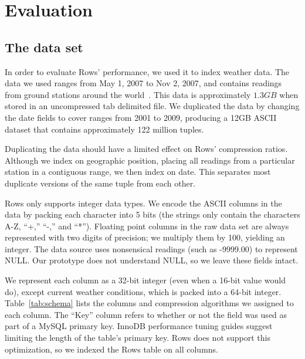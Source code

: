 \documentclass{sig-alternate-sigmod08}
\newcommand{\rows}{Rows\xspace}
\newcommand{\rowss}{Rows'\xspace}
\begin{document}
\section{Evaluation}

\subsection{The data set}

In order to evaluate \rowss performance, we used it to index
weather data.  The data we used ranges from May 1,
2007 to Nov 2, 2007, and contains readings from ground stations around
the world~\cite{nssl}.  This data is approximately $1.3GB$ when stored in an
uncompressed tab delimited file.  We duplicated the data by changing
the date fields to cover ranges from 2001 to 2009, producing a 12GB
ASCII dataset that contains approximately 122 million tuples.

Duplicating the data should have a limited effect on \rowss
compression ratios.  Although we index on geographic position, placing
all readings from a particular station in a contiguous range, we then
index on date.  This separates most duplicate versions of the same tuple
from each other.

\rows only supports integer data types.  We encode the ASCII columns
in the data by packing each character into 5 bits (the strings only
contain the characters A-Z, ``+,'' ``-,'' and ``*'').  Floating point columns in
the raw data set are always represented with two digits of precision;
we multiply them by 100, yielding an integer.  The data source uses
nonsensical readings (such as -9999.00) to represent NULL.  Our
prototype does not understand NULL, so we leave these fields intact.

We represent each column as a 32-bit integer (even when a 16-bit value
would do), except current weather conditions, which is packed into a
64-bit integer.  Table~\ref{tab:schema} lists the columns and
compression algorithms we assigned to each column.  The ``Key'' column refers
to whether or not the field was used as part of a MySQL primary key.
InnoDB performance tuning guides suggest limiting the length of the
table's primary key.  \rows does not support this optimization, so we
indexed the \rows table on all columns.
\end{document}
